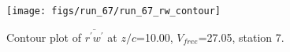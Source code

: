 \begin{figure}[H]
\centering
\texttt{[image: figs/run\_67/run\_67\_rw\_contour]}
\caption{Contour plot of $\overline{r^\prime w^\prime}$ at $z/c$=10.00, $V_{free}$=27.05, station 7.}
\label{fig:run_67_rw_contour}
\end{figure}


